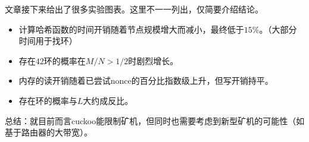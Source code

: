 文章接下来给出了很多实验图表。这里不一一列出，仅简要介绍结论。
\begin{itemize}
	\item 计算哈希函数的时间开销随着节点规模增大而减小，最终低于$15\%$。（大部分时间用于找环）
	\item 存在$42$环的概率在$M/N>1/2$时剧烈增长。
	\item 内存的读开销随着已尝试nonce的百分比指数级上升，但写开销持平。
	\item 存在环的概率与$L$大约成反比。
\end{itemize}

总结：就目前而言cuckoo能限制矿机，但同时也需要考虑到新型矿机的可能性（如基于路由器的大带宽）。